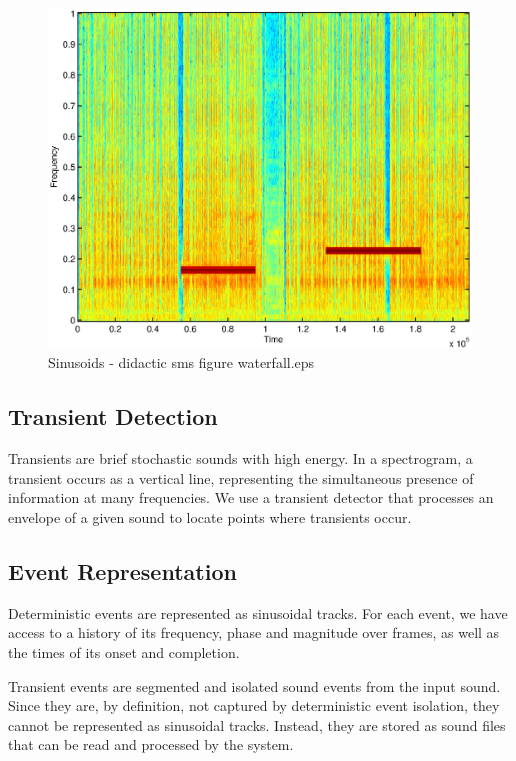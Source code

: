\documentclass{acmsiggraph}               %
\begin{document}
\begin{figure}[h]
\centering
\includegraphics[width=.95\columnwidth]{story1.eps}
\caption{Sinusoids - didactic sms figure waterfall.eps}
\end{figure}

\subsection{Transient Detection}

Transients are brief stochastic sounds with high energy. In a 
spectrogram, a transient occurs as a vertical line, representing the 
simultaneous presence of information at many frequencies. We use a 
transient detector that processes an envelope of a given sound to locate 
points where transients occur.

\subsection{Event Representation}

Deterministic events are represented as sinusoidal tracks. For each 
event, we have access to a history of its frequency, phase and magnitude 
over frames, as well as the times of its onset and completion. 

Transient events are segmented and isolated sound events from the input sound.
Since they are, by definition, not captured by deterministic event isolation, they cannot be
represented as sinusoidal tracks. Instead, they are stored as sound files that can be read and processed by the system. 
\end{document}
